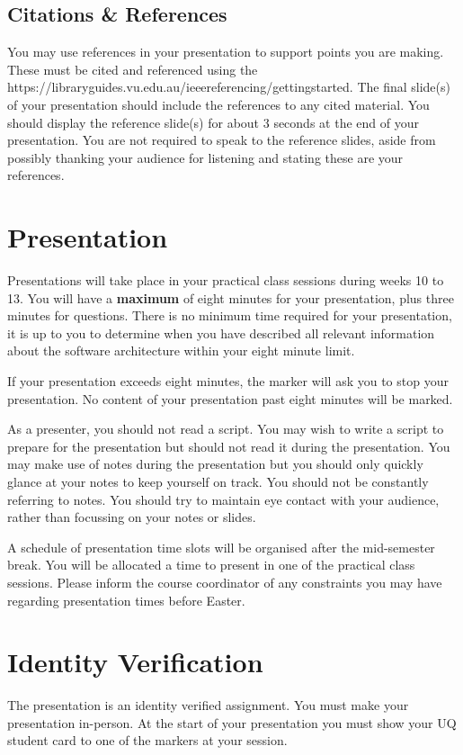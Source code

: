 \documentclass{csse4400}
\begin{document}
\subsection{Citations \& References}
You may use references in your presentation to support points you are making.
These must be cited and referenced using the 
{https://libraryguides.vu.edu.au/ieeereferencing/gettingstarted}.
The final slide(s) of your presentation should include the references to any cited material.
You should display the reference slide(s) for about 3 seconds at the end of your presentation.
You are not required to speak to the reference slides,
aside from possibly thanking your audience for listening and stating these are your references.


\section{Presentation}
Presentations will take place in your practical class sessions during weeks 10 to 13.
You will have a \textbf{maximum} of eight minutes for your presentation, plus three minutes for questions.
There is no minimum time required for your presentation,
it is up to you to determine when you have described all relevant information about the software architecture within your eight minute limit.

If your presentation exceeds eight minutes, the marker will ask you to stop your presentation.
No content of your presentation past eight minutes will be marked.

As a presenter, you should not read a script.
You may wish to write a script to prepare for the presentation but should not read it during the presentation.
You may make use of notes during the presentation but you should only quickly glance at your notes to keep yourself on track.
You should not be constantly referring to notes.
You should try to maintain eye contact with your audience, rather than focussing on your notes or slides.

A schedule of presentation time slots will be organised after the mid-semester break.
You will be allocated a time to present in one of the practical class sessions.
Please inform the course coordinator of any constraints you may have regarding presentation times before Easter.


\section{Identity Verification}
The presentation is an identity verified assignment.
You must make your presentation in-person.
At the start of your presentation you must show your UQ student card to one of the markers at your session.
\end{document}
